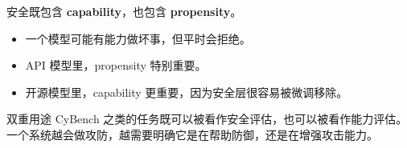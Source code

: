 安全既包含 \textbf{capability}，也包含 \textbf{propensity}。

\begin{itemize}
    \item 一个模型可能有能力做坏事，但平时会拒绝。
    \item API 模型里，propensity 特别重要。
    \item 开源模型里，capability 更重要，因为安全层很容易被微调移除。
\end{itemize}

\begin{warningbox}{双重用途}
CyBench 之类的任务既可以被看作安全评估，也可以被看作能力评估。一个系统越会做攻防，越需要明确它是在帮助防御，还是在增强攻击能力。
\end{warningbox}

